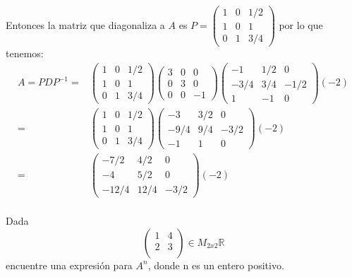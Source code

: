 \documentclass[letter]{memoir} %
\newenvironment{cframed}[1][blue]
  {\begin{tcolorbox}[colframe=#1,colback=white]}
  {\end{tcolorbox}}
\begin{document}
\begin{enumerate}
Entonces la matriz que diagonaliza a $A$ es $P=\begin{pmatrix}
												1 & 0 &1/2\\
                                                1 & 0 & 1\\
                                                0 & 1& 3/4
												\end{pmatrix}$ por lo que tenemos:\\
\[
\begin{split}
	 A = PDP^{-1} =&  
\begin{pmatrix}
1 & 0 &1/2\\
  1 & 0 & 1\\
 0 & 1& 3/4
 \end{pmatrix}	 
 \begin{pmatrix}
    3 & 0& 0\\
    0 & 3 & 0\\
    0 & 0 & -1
    \end{pmatrix} 
    	 \begin{pmatrix}
    -1 & 1/2 & 0\\
    -3/4 & 3/4& -1/2\\
    1 & -1 & 0
    \end{pmatrix} (-2)\\
    =& 
    \begin{pmatrix}
1 & 0 &1/2\\
  1 & 0 & 1\\
 0 & 1& 3/4
 \end{pmatrix}	 
 	 \begin{pmatrix}
    -3 & 3/2 & 0\\
    -9/4 & 9/4& -3/2\\
    -1 & 1 & 0
    \end{pmatrix}(-2)
    \\
    =& 
    \begin{pmatrix}
    -7/2 & 4/2 & 0\\ -4 & 5/2 & 0 \\ -12/4& 12/4 & -3/2 
    \end{pmatrix}(-2)
    \\
\end{split}
\]
                                                
                                                
\begin{cframed}[violet]
\item Dada 
	$$\begin{pmatrix}
	1&4\\
	2&3\\
	\end{pmatrix}\in M_{2x2} \mathbb{R}$$
encuentre una expresión para $A^{n}$, donde n es un entero positivo.


\end{cframed}
\end{enumerate}
\end{document}
